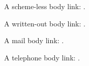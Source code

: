 \documentclass{careerdossier-resume}
\begin{document}
\MakeCDossierHeader
{}
A scheme-less body link: .

A written-out body link: .

A mail body link: .

A telephone body link: .
\end{document}
